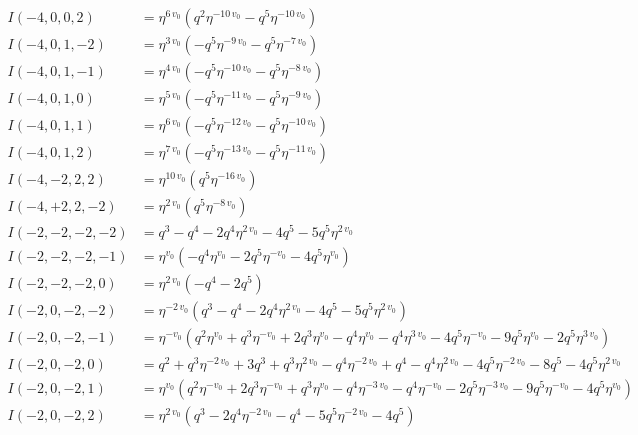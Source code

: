 \documentclass[11pt,a4paper]{article}
\begin{document}
\begin{align*}
I(-4, 0, 0, 2) &= \eta^{6 \, v_{0}} \left( q^{2} \eta^{-10 \, v_{0}} - q^{5} \eta^{-10 \, v_{0}} \right) \\
I(-4, 0, 1, -2) &= \eta^{3 \, v_{0}} \left( -q^{5} \eta^{-9 \, v_{0}} - q^{5} \eta^{-7 \, v_{0}} \right) \\
I(-4, 0, 1, -1) &= \eta^{4 \, v_{0}} \left( -q^{5} \eta^{-10 \, v_{0}} - q^{5} \eta^{-8 \, v_{0}} \right) \\
I(-4, 0, 1, 0) &= \eta^{5 \, v_{0}} \left( -q^{5} \eta^{-11 \, v_{0}} - q^{5} \eta^{-9 \, v_{0}} \right) \\
I(-4, 0, 1, 1) &= \eta^{6 \, v_{0}} \left( -q^{5} \eta^{-12 \, v_{0}} - q^{5} \eta^{-10 \, v_{0}} \right) \\
I(-4, 0, 1, 2) &= \eta^{7 \, v_{0}} \left( -q^{5} \eta^{-13 \, v_{0}} - q^{5} \eta^{-11 \, v_{0}} \right) \\
I(-4, -2, 2, 2) &= \eta^{10 \, v_{0}} \left( q^{5} \eta^{-16 \, v_{0}} \right) \\
I(-4, +2, 2, -2) &= \eta^{2 \, v_{0}} \left( q^{5} \eta^{-8 \, v_{0}} \right) \\
I(-2, -2, -2, -2) &= q^{3} - q^{4} - 2 q^{4} \eta^{2 \, v_{0}} - 4 q^{5} - 5 q^{5} \eta^{2 \, v_{0}} \\
I(-2, -2, -2, -1) &= \eta^{v_{0}} \left( -q^{4} \eta^{v_{0}} - 2 q^{5} \eta^{-v_{0}} - 4 q^{5} \eta^{v_{0}} \right) \\
I(-2, -2, -2, 0) &= \eta^{2 \, v_{0}} \left( -q^{4} - 2 q^{5} \right) \\
I(-2, 0, -2, -2) &= \eta^{-2 \, v_{0}} \left( q^{3} - q^{4} - 2 q^{4} \eta^{2 \, v_{0}} - 4 q^{5} - 5 q^{5} \eta^{2 \, v_{0}} \right) \\
I(-2, 0, -2, -1) &= \eta^{-v_{0}} \left( q^{2} \eta^{v_{0}} + q^{3} \eta^{-v_{0}} + 2 q^{3} \eta^{v_{0}} - q^{4} \eta^{v_{0}} - q^{4} \eta^{3 \, v_{0}} - 4 q^{5} \eta^{-v_{0}} - 9 q^{5} \eta^{v_{0}} - 2 q^{5} \eta^{3 \, v_{0}} \right) \\
I(-2, 0, -2, 0) &= q^{2} + q^{3} \eta^{-2 \, v_{0}} + 3 q^{3} + q^{3} \eta^{2 \, v_{0}} - q^{4} \eta^{-2 \, v_{0}} + q^{4} - q^{4} \eta^{2 \, v_{0}} - 4 q^{5} \eta^{-2 \, v_{0}} - 8 q^{5} - 4 q^{5} \eta^{2 \, v_{0}} \\
I(-2, 0, -2, 1) &= \eta^{v_{0}} \left( q^{2} \eta^{-v_{0}} + 2 q^{3} \eta^{-v_{0}} + q^{3} \eta^{v_{0}} - q^{4} \eta^{-3 \, v_{0}} - q^{4} \eta^{-v_{0}} - 2 q^{5} \eta^{-3 \, v_{0}} - 9 q^{5} \eta^{-v_{0}} - 4 q^{5} \eta^{v_{0}} \right) \\
I(-2, 0, -2, 2) &= \eta^{2 \, v_{0}} \left( q^{3} - 2 q^{4} \eta^{-2 \, v_{0}} - q^{4} - 5 q^{5} \eta^{-2 \, v_{0}} - 4 q^{5} \right) \\

\end{align*}
\end{document}
